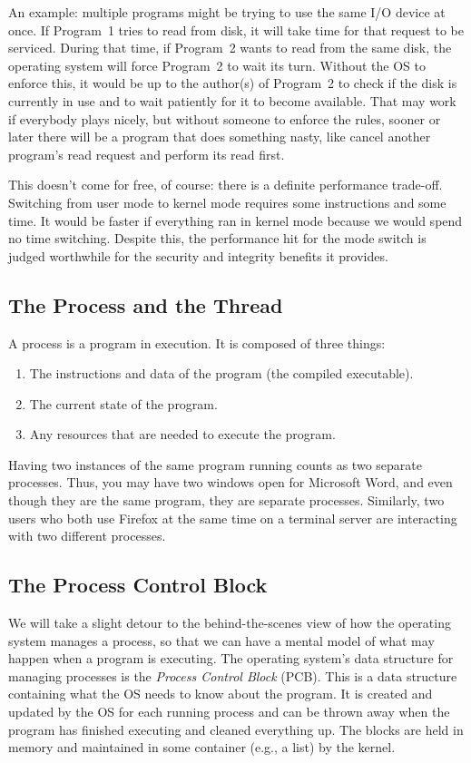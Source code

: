 An example: multiple programs might be trying to use the same I/O device at once. If Program~1 tries to read from disk, it will take time for that request to be serviced. During that time, if Program~2 wants to read from the same disk, the operating system will force Program~2 to wait its turn. Without the OS to enforce this, it would be up to the author(s) of Program~2 to check if the disk is currently in use and to wait patiently for it to become available. That may work if everybody plays nicely, but without someone to enforce the rules, sooner or later there will be a program that does something nasty, like cancel another program's read request and perform its read first.

This doesn't come for free, of course: there is a definite performance trade-off. Switching from user mode to kernel mode requires some instructions and some time. It would be faster if everything ran in kernel mode because we would spend no time switching. Despite this, the performance hit for the mode switch is judged worthwhile for the security and integrity benefits it provides.


\subsection*{The Process and the Thread}

A process is a program in execution. It is composed of three things:

\begin{enumerate}
	\item The instructions and data of the program (the compiled executable).
	\item The current state of the program.
	\item Any resources that are needed to execute the program.
\end{enumerate}

Having two instances of the same program running counts as two separate processes. Thus, you may have two windows open for Microsoft Word, and even though they are the same program, they are separate processes. Similarly, two users who both use Firefox at the same time on a terminal server are interacting with two different processes.

\subsection*{The Process Control Block}
We will take a slight detour to the behind-the-scenes view of how the operating system manages a process, so that we can have a mental model of what may happen when a program is executing. The operating system's data structure for managing processes is the \textit{Process Control Block} (PCB). This is a data structure containing what the OS needs to know about the program. It is created and updated by the OS for each running process and can be thrown away when the program has finished executing and cleaned everything up. The blocks are held in memory and maintained in some container (e.g., a list) by the kernel.

